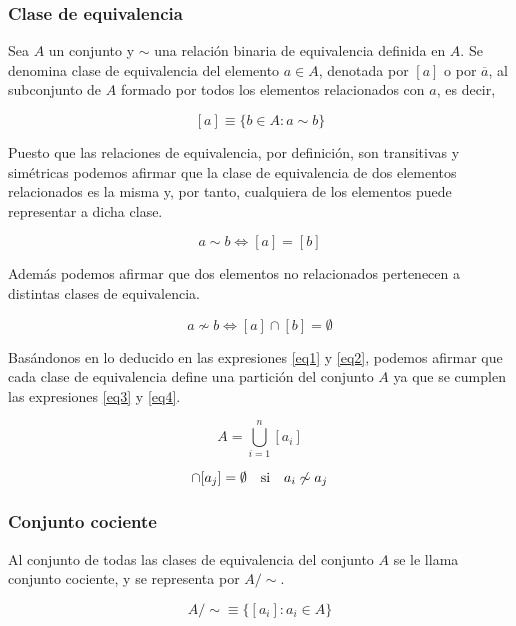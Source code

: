 \documentclass[0_algebra.tex]{subfiles}
\begin{document}
\subsubsection*{Clase de equivalencia}
Sea $A$ un conjunto y $\sim$ una relación binaria de equivalencia definida en $A$. Se denomina clase de equivalencia del elemento $a\in A$, denotada por $[a]$ o por $\overline{a}$, al subconjunto de $A$ formado por todos los elementos relacionados con $a$, es decir,

$$
[a]\equiv \lbrace b \in A : a \sim b \rbrace
$$

Puesto que las relaciones de equivalencia, por definición, son transitivas y simétricas podemos afirmar que la clase de equivalencia de dos elementos relacionados es la misma y, por tanto, cualquiera de los elementos puede representar a dicha clase.

\begin{equation}
a\sim b \Leftrightarrow [a]=[b]
\label{eq1}
\end{equation}



Además podemos afirmar que dos elementos no relacionados pertenecen a distintas clases de equivalencia.

\begin{equation}
a \not \sim b \Leftrightarrow [a] \cap [b] = \emptyset
\label{eq2}
\end{equation}

Basándonos en lo deducido en las expresiones \ref{eq1} y \ref{eq2}, podemos afirmar que cada clase de equivalencia define una partición del conjunto $A$ ya que se cumplen las expresiones \ref{eq3} y \ref{eq4}.

\begin{equation}
A=\bigcup_{i=1}^n [a_i]
\label{eq3}
\end{equation}


\begin{equation}
[a_i]\cap [a_j]=\emptyset \quad \text{si\quad }a_i \not\sim a_j
\label{eq4}
\end{equation}

\subsubsection*{Conjunto cociente}
Al conjunto de todas las clases de equivalencia del conjunto $A$ se le llama conjunto cociente, y se representa por $A/\sim$.

$$
A/\sim \equiv \lbrace [a_i] : a_i \in A \rbrace
$$
\end{document}
